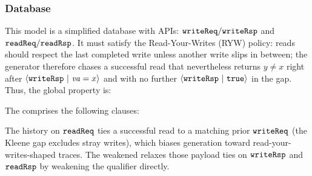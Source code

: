 \subsubsection*{Database}
This model is a simplified database with APIs: \(\boldsymbol{{\tt writeReq}}/\boldsymbol{{\tt writeRsp}}\) and \(\boldsymbol{{\tt readReq}}/\boldsymbol{{\tt readRsp}}\). It must satisfy the Read-Your-Writes (RYW) policy: reads should respect the last completed write unless another write slips in between; the generator therefore chases a successful read that nevertheless returns \(y\neq x\) right after \({\langle} {\boldsymbol{{\tt writeRsp}}~|~{\mathit{va}=x}} {\rangle}\) and with no further \({\langle} {\boldsymbol{{\tt writeRsp}}~|~{{\tt true}}} {\rangle}\) in the gap. Thus, the global property is:
\vspace{-.35cm}\par{}
\vspace{-.4cm}\par\nobreak\noindent
The \tyName{} comprises the following clauses:
\vspace{-.35cm}\par{}
\vspace{-.4cm}\par\nobreak\noindent
The history on \(\boldsymbol{{\tt readReq}}\) ties a successful read to a matching prior \(\boldsymbol{{\tt writeReq}}\) (the Kleene gap excludes stray writes), which biases generation toward read-your-writes-shaped traces. The weakened \tyName{} relaxes those payload ties on \(\boldsymbol{{\tt writeRsp}}\) and \(\boldsymbol{{\tt readRsp}}\) by weakening the qualifier directly.

